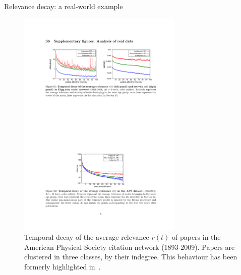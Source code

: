 \begin{frame}{Relevance decay: a real-world example}
    \begin{figure}
        \includegraphics[width=0.7\textwidth]{figures/RelevanceDecayAPS}
        \caption{Temporal decay of the average relevance $r(t)$ of papers in the American Physical Society citation network (1893-2009).
        Papers are clustered in three classes, by their indegree. This behaviour has been formerly highlighted in~\cite{Medo2011}.}
    \end{figure}
\end{frame}

